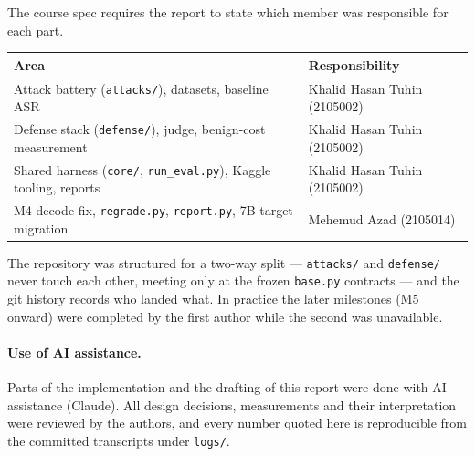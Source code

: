 \documentclass[11pt,a4paper]{article}
\begin{document}
The course spec requires the report to state which member was responsible for each part.

\begin{table}[!ht]
\centering\small
\begin{tabular}{@{}p{4.4cm}p{9.5cm}@{}}
\toprule
\textbf{Area} & \textbf{Responsibility} \\
\midrule
Attack battery (\texttt{attacks/}), datasets, baseline ASR & Khalid Hasan Tuhin (2105002) \\
Defense stack (\texttt{defense/}), judge, benign-cost measurement & Khalid Hasan Tuhin (2105002) \\
Shared harness (\texttt{core/}, \texttt{run\_eval.py}), Kaggle tooling, reports & Khalid Hasan Tuhin (2105002) \\
M4 decode fix, \texttt{regrade.py}, \texttt{report.py}, 7B target migration & Mehemud Azad (2105014) \\
\bottomrule
\end{tabular}
\end{table}

\noindent The repository was structured for a two-way split --- \texttt{attacks/} and \texttt{defense/} never touch each other, meeting only at the frozen \texttt{base.py} contracts --- and the git history records who landed what. In practice the later milestones (M5 onward) were completed by the first author while the second was unavailable.

\paragraph{Use of AI assistance.} Parts of the implementation and the drafting of this report were done with AI assistance (Claude). All design decisions, measurements and their interpretation were reviewed by the authors, and every number quoted here is reproducible from the committed transcripts under \texttt{logs/}.
\end{document}
